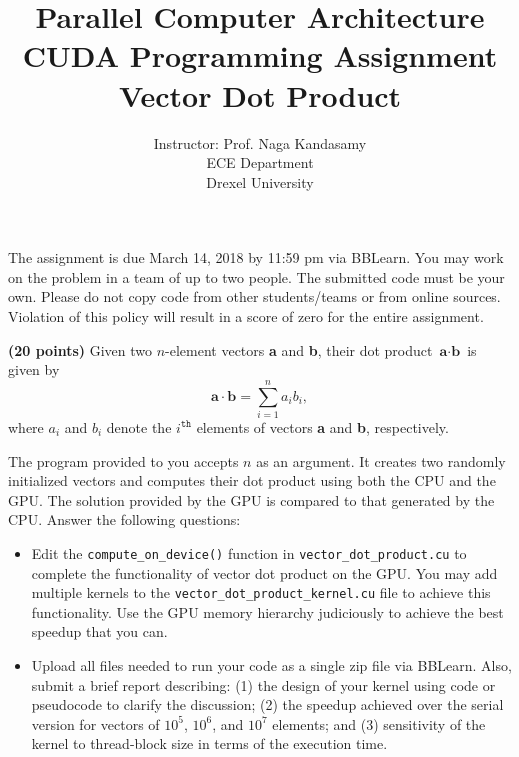 \documentclass[12pt]{article}
\begin{document}
\title{Parallel Computer Architecture \\
CUDA Programming Assignment \\
Vector Dot Product}
\author{Instructor: Prof. Naga Kandasamy \\ ECE Department \\ Drexel University}
\maketitle %
\date{}

The assignment is due March 14, 2018 by 11:59 pm via BBLearn. You may work on the problem in a team of up to two people. The submitted code must be your own. Please do not copy code from other students/teams or from online sources. Violation of this policy will result in a score of zero for the entire assignment.
\vspace{12pt}

\textbf{(20 points)} Given two $n$-element vectors \textbf{a} and \textbf{b}, their dot product $\textbf{a} \cdot \textbf{b}$ is given by
\begin{equation*}
\textbf{a} \cdot \textbf{b} = \sum_{i = 1}^{n}a_ib_i,
\end{equation*}
where $a_i$ and $b_i$ denote the $i^{\texttt{th}}$ elements of vectors \textbf{a} and \textbf{b}, respectively.

The program provided to you accepts $n$ as an argument. It creates two randomly initialized vectors and computes their dot product using both the CPU and the GPU. The solution provided by the GPU is compared to that generated by the CPU. Answer the following questions:
\begin{itemize}
\item Edit the \texttt{compute\_on\_device()} function in \texttt{vector\_dot\_product.cu} to complete the functionality of vector dot product on the GPU. You may add multiple kernels to the \texttt{vector\_dot\_product\_kernel.cu} file to achieve this functionality. Use the GPU memory hierarchy judiciously to achieve the best speedup that you can.
    
\item Upload all files needed to run your code as a single zip file via BBLearn. Also, submit a brief report describing: (1) the design of your kernel using code or pseudocode to clarify the discussion; (2) the speedup achieved over the serial version for vectors of $10^5$, $10^6$, and $10^7$ elements; and (3) sensitivity of the kernel to thread-block size in terms of the execution time.
\end{itemize}
\end{document}
